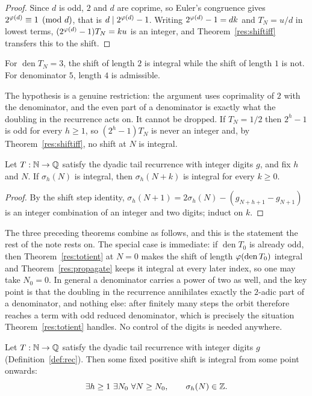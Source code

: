\documentclass[11pt]{article}
\begin{document}
\begin{proof}
Since $d$ is odd, $2$ and $d$ are coprime, so Euler's congruence gives
$2^{\varphi(d)}\equiv1\pmod d$, that is $d\mid 2^{\varphi(d)}-1$.  Writing
$2^{\varphi(d)}-1=dk$ and $T_N=u/d$ in lowest terms, $(2^{\varphi(d)}-1)T_N=ku$ is an
integer, and Theorem~\ref{res:shiftiff} transfers this to the shift.
\end{proof}

For $\operatorname{den}T_N=3$, the shift of length $2$ is integral
while the shift of length $1$ is not.  For denominator $5$, length $4$
is admissible.

The hypothesis is a genuine restriction: the argument uses
coprimality of $2$ with the denominator, and the even part of a denominator is
exactly what the doubling in the recurrence acts on.  It cannot be dropped.
If $T_N=1/2$ then $2^{h}-1$ is odd for every $h\ge1$, so $(2^{h}-1)T_N$ is
never an integer and, by Theorem~\ref{res:shiftiff}, no shift at $N$ is
integral.

\begin{theorem}[propagation]\label{res:propagate}
Let $T:\mathbb{N}\to\mathbb{Q}$ satisfy the dyadic tail recurrence with integer digits $g$, and
fix $h$ and $N$.  If $\sigma_h(N)$ is integral, then $\sigma_h(N+k)$ is
integral for every $k\ge0$.
\end{theorem}

\begin{proof}
By the shift step identity, $\sigma_h(N+1)=2\sigma_h(N)-(g_{N+h+1}-g_{N+1})$ is
an integer combination of an integer and two digits; induct on $k$.
\end{proof}

The three preceding theorems combine as follows, and this is the statement the
rest of the note rests on.  The special case is immediate: if
$\operatorname{den}T_0$ is already odd, then Theorem~\ref{res:totient} at
$N=0$ makes the shift of length $\varphi(\operatorname{den}T_0)$ integral and
Theorem~\ref{res:propagate} keeps it integral at every later index, so one may
take $N_0=0$.  In general a denominator carries a power of two as well, and the
key point is that the doubling in the recurrence annihilates
exactly the $2$-adic part of a denominator, and nothing else: after finitely
many steps the orbit therefore reaches a term with odd reduced denominator,
which is precisely the situation Theorem~\ref{res:totient} handles.  No
control of the digits is needed anywhere.

\begin{theorem}\label{res:collapse}
Let $T:\mathbb{N}\to\mathbb{Q}$ satisfy the dyadic tail recurrence with integer digits $g$
(Definition~\ref{def:rec}).  Then some fixed positive shift is integral from
some point onwards:
\[
 \exists h\ge1\ \exists N_0\ \forall N\ge N_0,\qquad
 \sigma_h(N)\in\mathbb{Z} .
\]
\end{theorem}
\end{document}
